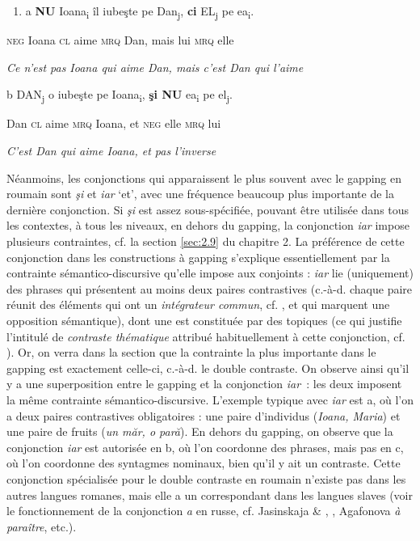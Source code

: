 \begin{enumerate}
\item a  \textbf{NU} Ioana\textsubscript{i} îl iubeşte pe Dan\textsubscript{j}, \textbf{ci} EL\textsubscript{j} pe ea\textsubscript{i}.


\end{enumerate}
\textsc{neg} Ioana \textsc{cl} aime \textsc{mrq} Dan, mais lui \textsc{mrq} elle

{\itshape
Ce n'est pas Ioana qui aime Dan, mais c'est Dan qui l'aime } 

  b  DAN\textsubscript{j} o iubeşte pe Ioana\textsubscript{i}, \textbf{şi NU} ea\textsubscript{i} pe el\textsubscript{j}.

    Dan \textsc{cl} aime \textsc{mrq} Ioana, et \textsc{neg} elle \textsc{mrq} lui

{\itshape
C'est Dan qui aime Ioana, et pas l'inverse}

Néanmoins, les conjonctions qui apparaissent le plus souvent avec le gapping en roumain sont \textit{şi} et \textit{iar} `et', avec une fréquence beaucoup plus importante de la dernière conjonction. Si \textit{şi} est assez sous-spécifiée, pouvant être utilisée dans tous les contextes, à tous les niveaux, en dehors du gapping, la conjonction \textit{iar} impose plusieurs contraintes, cf. la section \ref{sec:2.9} du chapitre 2. La préférence de cette conjonction dans les constructions à gapping s'explique essentiellement par la contrainte sémantico-discursive qu'elle impose aux conjoints : \textit{iar} lie (uniquement) des phrases qui présentent au moins deux paires contrastives (c.-à-d. chaque paire réunit des éléments qui ont un \textit{intégrateur commun}, cf. \citet{Lang1984}, et qui marquent une opposition sémantique), dont une est constituée par des topiques (ce qui justifie l'intitulé de \textit{contraste thématique} attribué habituellement à cette conjonction, cf. \citet{Zafiu2005}). Or, on verra dans la section  que la contrainte la plus importante dans le gapping est exactement celle-ci, c.-à-d. le double contraste. On observe ainsi qu'il y a une superposition entre le gapping et la conjonction \textit{iar~}: les deux imposent la même contrainte sémantico-discursive. L'exemple typique avec \textit{iar} est a, où l'on a deux paires contrastives obligatoires : une paire d'individus (\textit{Ioana, Maria}) et une paire de fruits (\textit{un măr, o pară}). En dehors du gapping, on observe que la conjonction \textit{iar} est autorisée en b, où l'on coordonne des phrases, mais pas en c, où l'on coordonne des syntagmes nominaux, bien qu'il y ait un contraste. Cette conjonction spécialisée pour le double contraste en roumain n'existe pas dans les autres langues romanes, mais elle a un correspondant dans les langues slaves (voir le fonctionnement de la conjonction \textit{a} en russe, cf. Jasinskaja \& \citet{Zeevat2009}, \citet{Kazenin2001}, Agafonova \textit{à paraître}, etc.).  


